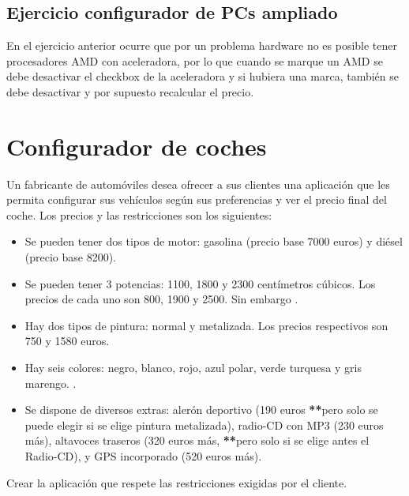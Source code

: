 \documentclass[letterpaper,10pt,spanish]{sphinxmanual}
\begin{document}
\subsection{Ejercicio configurador de PCs ampliado}
\label{\detokenize{tema4:ejercicio-configurador-de-pcs-ampliado}}
En el ejercicio anterior ocurre que por un problema hardware no es posible tener procesadores AMD con aceleradora, por lo que cuando se marque un AMD se debe desactivar el checkbox de la aceleradora y si hubiera una marca, también se debe desactivar y por supuesto recalcular el precio.


\section{Configurador de coches}
\label{\detokenize{tema4:configurador-de-coches}}
Un fabricante de automóviles desea ofrecer a sus clientes una aplicación que les permita configurar sus vehículos según sus preferencias y ver el precio final del coche. Los precios y las restricciones son los siguientes:
\begin{itemize}
\item {} 
Se pueden tener dos tipos de motor: gasolina (precio base 7000 euros) y diésel (precio base 8200).

\item {} 
Se pueden tener 3 potencias: 1100, 1800 y 2300 centímetros cúbicos. Los precios de cada uno son 800, 1900 y 2500. Sin embargo .

\item {} 
Hay dos tipos de pintura: normal y metalizada. Los precios respectivos son 750 y 1580 euros.

\item {} 
Hay seis colores: negro, blanco, rojo, azul polar, verde turquesa y gris marengo. .

\item {} 
Se dispone de diversos extras: alerón deportivo (190 euros {\color{red}\bfseries{}**}pero solo se puede elegir si se elige pintura metalizada), radio-CD con MP3 (230 euros más), altavoces traseros (320 euros más, {\color{red}\bfseries{}**}pero solo si se elige antes el Radio-CD), y GPS incorporado (520 euros más).

\end{itemize}

Crear la aplicación que respete las restricciones exigidas por el cliente.
\end{document}
